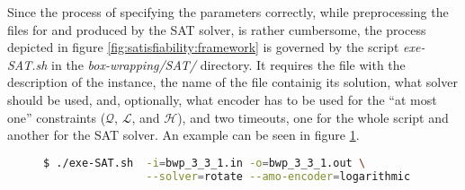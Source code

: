 Since the process of specifying the parameters correctly, while preprocessing the
files for and produced by the SAT solver, is rather cumbersome, the process depicted
in figure \ref{fig:satisfiability:framework} is governed by the script \textit{exe-SAT.sh}
in the \textit{box-wrapping/SAT/} directory. It requires the file with the description
of the instance, the name of the file containig its solution, what solver should be
used, and, optionally, what encoder has to be used for the ``at most one'' constraints
($\mathcal{Q}$, $\mathcal{L}$, and $\mathcal{H}$), and two timeouts, one for the whole
script and another for the SAT solver. An example can be seen in figure
\ref{fig:satisfiability:gov-script}.

\begin{figure}[H]
\centering
\begin{lstlisting}[language=bash,basicstyle=\centering]
$ ./exe-SAT.sh	-i=bwp_3_3_1.in -o=bwp_3_3_1.out \
				--solver=rotate	--amo-encoder=logarithmic
\end{lstlisting}
\label{fig:satisfiability:gov-script}
\end{figure}

